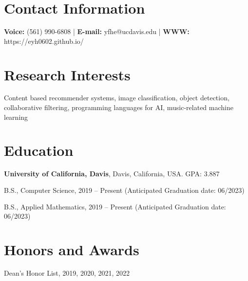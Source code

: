 \documentclass[margin,line]{res}
\newenvironment{list1}{
  \begin{list}{\ding{113}}{%
      \setlength{\itemsep}{0in}
      \setlength{\parsep}{0in} \setlength{\parskip}{0in}
      \setlength{\topsep}{0in} \setlength{\partopsep}{0in} 
      \setlength{\leftmargin}{0.17in}}}{\end{list}}
\begin{document}

\begin{resume}
\section{\sc Contact Information}
\vspace{.05in}
\textbf{Voice:} (561) 990-6808 |
\textbf{E-mail:} yfhe@ucdavis.edu |
\textbf{WWW:} https://eyh0602.github.io/


\section{\sc Research Interests}
Content based recommender systems, image classification, object detection,
collaborative filtering, programming languages for AI,
music-related machine learning

\section{\sc Education}
{\bf University of California, Davis}, Davis, California, USA. GPA: 3.887\\
\vspace*{-.1in}
\begin{list1}
\item[] B.S., Computer Science, 2019 -- Present (Anticipated Graduation date: 06/2023)
\item[] B.S., Applied Mathematics, 2019 -- Present (Anticipated Graduation date: 06/2023)
\end{list1}


\section{\sc Honors and Awards} 
Dean's Honor List, 2019, 2020, 2021, 2022


\end{resume}
\end{document}
